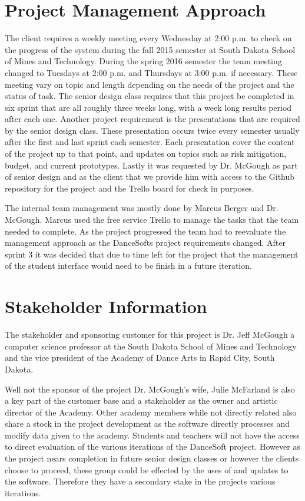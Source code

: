 \section{Project Management Approach}
The client requires a weekly meeting every Wednesday at 2:00 p.m. to check on the progress of the system during the fall 2015 semester at South Dakota School of Mines and Technology. During the spring 2016 semester the team meeting changed to Tuesdays at 2:00 p.m. and Thursdays at 3:00 p.m. if necessary. These meeting vary on topic and length depending on the needs of the project and the status of task. The senior design class requires that this project be completed in six sprint that are all roughly three weeks long, with a week long results period after each one. Another project requirement is the presentations that are required by the senior design class. These presentation occurs twice every semester usually after the first and last sprint each semester. Each presentation cover the content of the project up to that point, and updates on topics such as risk mitigation, budget, and current prototypes. Lastly it was requested by Dr. McGough as part of senior design and as the client that we provide him with access to the Github repository for the project and the Trello board for check in purposes.

The internal team management was mostly done by Marcus Berger and Dr. McGough. Marcus used the free service Trello to manage the tasks that the team needed to complete. As the project progressed the team had to reevaluate the management approach as the DanceSofts project requirements changed. After sprint 3 it was decided that due to time left for the project that the management of the student interface would need to be finish in a future iteration.    


\section{Stakeholder Information}

The stakeholder and sponsoring customer for this project is Dr. Jeff McGough a computer science professor at the South Dakota School of Mines and Technology and the vice president of the Academy of Dance Arts in Rapid City, South Dakota.


Well not the sponsor of the project Dr. McGough's wife, Julie McFarland is also a key part of the customer base and a stakeholder as the owner and artistic director of the Academy. Other academy members while not directly related also share a stock in the project development as the software directly processes and modify data given to the academy. Students and teachers will not have the access to direct evaluation of the various iterations of the DanceSoft project. However as the project nears completion in future senior design classes or however the clients choose to proceed, these group could be effected by the uses of and updates to the software. Therefore they have a secondary stake in the projects various iterations. 


